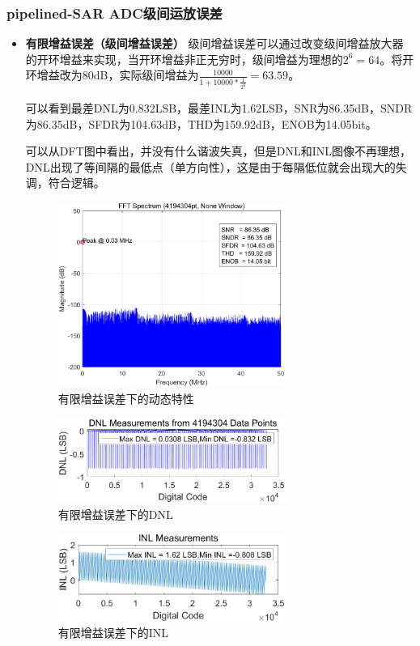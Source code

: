 \documentclass[cs4size,a4paper]{ctexart}
\numberwithin{equation}{section}
\numberwithin{table}{section}
\numberwithin{figure}{section}
\begin{document}
	\subsubsection{pipelined-SAR ADC级间运放误差}
	\begin{itemize}
		\item \textbf{有限增益误差（级间增益误差）} 级间增益误差可以通过改变级间增益放大器的开环增益来实现，当开环增益非正无穷时，级间增益为理想的$2^6=64$。将开环增益改为80dB，实际级间增益为$\frac{10000}{1+10000*\frac{1}{2^6}}=63.59$。
		
		可以看到最差DNL为0.832LSB，最差INL为1.62LSB，SNR为86.35dB，SNDR为86.35dB，SFDR为104.63dB，THD为159.92dB，ENOB为14.05bit。
		
		可以从DFT图中看出，并没有什么谐波失真，但是DNL和INL图像不再理想，DNL出现了等间隔的最低点（单方向性），这是由于每隔低位就会出现大的失调，符合逻辑。
		\begin{figure}[H]
			\centering
			\includegraphics[width=0.7\textwidth]{pic/Av/DFT.png}
			\caption{有限增益误差下的动态特性} 
		\end{figure}

		\begin{figure}[H]
			\centering
			\includegraphics[width=0.7\textwidth]{pic/Av/DNL.png}
			\caption{有限增益误差下的DNL} 
		\end{figure}

		\begin{figure}[H]
			\centering
			\includegraphics[width=0.7\textwidth]{pic/Av/INL.png}
			\caption{有限增益误差下的INL} 
		\end{figure}


\end{itemize}
\end{document}
